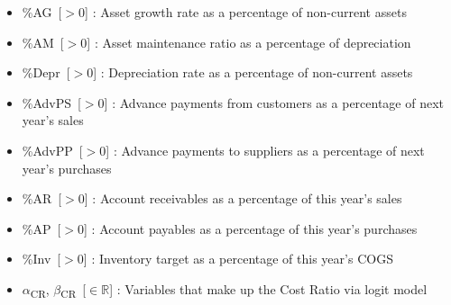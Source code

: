 \documentclass[12pt,a4paper]{article}
\begin{document}
\begin{itemize}
\item
  \%AG\, [$>0$] : Asset growth rate as a percentage of non-current assets
\item
  \%AM\, [$>0$] : Asset maintenance ratio as a percentage of depreciation
\item
  \%Depr\, [$>0$] : Depreciation rate as a percentage of non-current assets
\item
  \%AdvPS\, [$>0$] : Advance payments from customers as a percentage of next
  year's sales
\item
  \%AdvPP\, [$>0$] : Advance payments to suppliers as a percentage of next year's
  purchases
\item
  \%AR\, [$>0$] : Account receivables as a percentage of this year's sales
\item
  \%AP\, [$>0$] : Account payables as a percentage of this year's purchases
\item
  \%Inv\, [$>0$] : Inventory target as a percentage of this year's COGS
\item
  $\alpha$\textsubscript{CR}, $\beta$\textsubscript{CR}\, [$\in \mathbb{R}$] :
  Variables that make up the Cost Ratio via logit model


\end{itemize}
\end{document}
